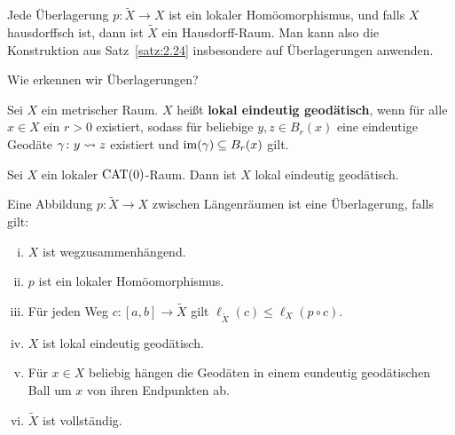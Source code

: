 \begin{bemerkung}
\label{bem:2.25}
	Jede Überlagerung $p\colon \tilde{X} \rightarrow X$ ist ein lokaler Homöomorphismus, und falls $X$ hausdorffsch ist, dann ist $\tilde{X}$ ein Hausdorff-Raum.
	Man kann also die Konstruktion aus Satz~\ref{satz:2.24} insbesondere auf Überlagerungen anwenden.
\end{bemerkung}

Wie erkennen wir Überlagerungen?

\begin{definition}
\label{def:2.26}
	Sei $X$ ein metrischer Raum.
	$X$ heißt \textbf{lokal eindeutig geodätisch}, wenn für alle $x \in X$ ein $r > 0$ existiert, sodass für beliebige $y,z \in B_r(x)$ eine eindeutige Geodäte $\gamma \colon y \rightsquigarrow z$ existiert und $\operatorname{im}(\gamma) \subseteq B_r(x)$ gilt. 
\end{definition}

\begin{beispiel}
\label{bsp:2.27}
	Sei $X$ ein lokaler $\operatorname{CAT(0)}$-Raum.
	Dann ist $X$ lokal eindeutig geodätisch.
\end{beispiel}

\begin{satz}
\label{satz:2.28}
	Eine Abbildung $p\colon \tilde{X} \rightarrow X$ zwischen Längenräumen ist eine Überlagerung, falls gilt:
	\begin{enumerate}[(i)]
		\item $X$ ist wegzusammenhängend.
		\item $p$ ist ein lokaler Homöomorphismus.
		\item Für jeden Weg $c \colon [a,b] \rightarrow \tilde{X}$ gilt $\ell_{\tilde{X}}(c) \leq \ell_X (p \circ c)$.
		\item $X$ ist lokal eindeutig geodätisch.
		\item Für $x \in X$ beliebig hängen die Geodäten in einem eundeutig geodätischen Ball um $x$ von ihren Endpunkten ab.
		\item $\tilde{X}$ ist vollständig.
	\end{enumerate}
\end{satz}

